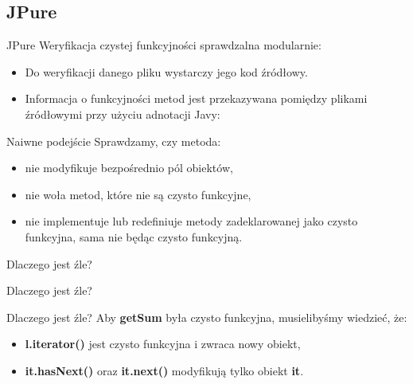 \documentclass[handout]{beamer}
\begin{document}
\subsection{JPure}

\begin{frame}{JPure}
  Weryfikacja czystej funkcyjności sprawdzalna modularnie:
  \begin{itemize}
    \item Do weryfikacji danego pliku wystarczy jego kod źródłowy.
    \item Informacja o funkcyjności metod jest przekazywana 
      pomiędzy plikami źródłowymi przy użyciu adnotacji Javy:
      \pause
      \vspace{0.3in}
      \begin{center}
      \end{center}
  \end{itemize}
\end{frame}

\begin{frame}{Naiwne podejście}
  Sprawdzamy, czy metoda:
  \begin{itemize}
  \item nie modyfikuje bezpośrednio pól obiektów,
  \item nie woła metod, które nie są czysto funkcyjne, 
  \item nie implementuje lub redefiniuje metody zadeklarowanej jako
    czysto funkcyjna, sama nie będąc czysto funkcyjną.
  \end{itemize}
  \pause
  \begin{center}
    \alert{Dlaczego jest źle?}
  \end{center}
\end{frame}

\begin{frame}{Dlaczego jest źle?}
  
\end{frame}

\begin{frame}{Dlaczego jest źle?}
  Aby \textbf{getSum} była czysto funkcyjna, musielibyśmy wiedzieć, że:
  \begin{itemize}
    \item \textbf{l.iterator()} jest czysto funkcyjna i zwraca nowy
      obiekt, 
    \item \textbf{it.hasNext()} oraz \textbf{it.next()} modyfikują 
      tylko obiekt \textbf{it}.
  \end{itemize}
\end{frame}
\end{document}
